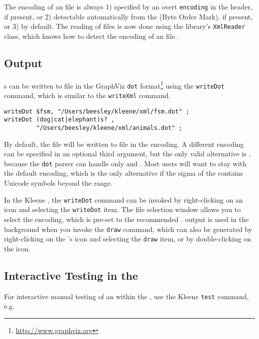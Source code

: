 The encoding of an
 file is always 1) specified by an overt \texttt{encoding} in
the  header, if present, or 2) detectable automatically from the
 (Byte Order Mark), if present, or 3)  by default.
The reading of  files is now done using the  library's
\texttt{XmlReader} class, which knows how to detect the encoding of an
 file.

\subsection{ Output}

\fsm{}s can be written to file in the GraphViz \verb!dot!
format\footnote{\url{http://www.graphviz.org}} using the
\texttt{writeDot} command, which is similar to the \texttt{writeXml} command.

\begin{Verbatim}
writeDot $fsm, "/Users/beesley/kleene/xml/fsm.dot" ;
writeDot (dog|cat|elephant)s? , 
         "/Users/beesley/kleene/xml/animals.dot" ;
\end{Verbatim}

By default, the file will be written to file in the 
encoding.  A different encoding can be specified in an optional third
argument, but the only valid alternative is , because
the \verb!dot! parser can handle only  and .
Most users will want to stay with the default  encoding,
which is the only alternative if the sigma of the \fsm{} contains
Unicode symbols beyond the  range.

In the Kleene , the \verb!writeDot! command can be invoked by
right-clicking on an \fsm{} icon and selecting the \verb!writeDot! item.
The file selection window allows you to select the encoding, which is pre-set to the recommended .   output is used in the
background when you invoke the \texttt{draw} command, which can also be
generated by right-clicking on the \fsm{}'s icon and selecting the \texttt{draw} item, or
by double-clicking on the icon.

\subsection{Interactive Testing in the }

For interactive manual testing of an \fsm{} within the ,
use the Kleene \texttt{test} command, e.g.

